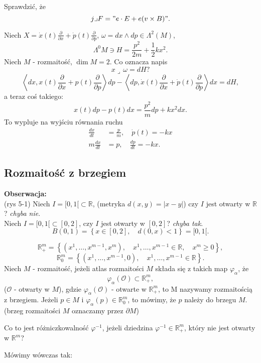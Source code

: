 \documentclass[../main.tex]{subfiles}
\begin{document}
    Sprawdzić, że
    \[
        j \lrcorner F = "e\cdot E + e(v\times B)"
    .\]
\begin{przyklad}
    Niech $X = \dot{x}(t)\frac{\partial }{\partial x} + \dot{p}(t)\frac{\partial }{\partial p} $, $\omega = dx\land dp \in \Lambda^2(M)$,
     \[
         \Lambda^0M \ni H = \frac{p^2}{2m} + \frac{1}{2}kx^2
    .\]
Niech $M$ - rozmaitość, $\dim M = 2$. Co oznacza napis
\[
x\lrcorner\, \omega = dH?
\]
\[
    \left<dx, x(t)\frac{\partial }{\partial x} + p(t)\frac{\partial }{\partial p} \right>dp - \left<dp, \dot{x}(t)\frac{\partial }{\partial x} + \dot{p}(t)\frac{\partial }{\partial p}  \right>dx = dH
,\]
a teraz coś takiego:
\[
    x(t)dp - p(t)dx = \frac{p^2}{m}dp + kx^2dx
.\]
To wypluje na wyjściu równania ruchu
\begin{align*}
    \frac{dx}{dt} &= \frac{p}{m},\quad \dot{p}(t) = -kx\\
    m \frac{dx}{dt} &= p, \quad \frac{dp}{dt} = -kx
.\end{align*}
\end{przyklad}
\subsection{Rozmaitość z brzegiem}
\textbf{Obserwacja:}\\
(rys 5-1)
Niech $I = [0,1[\subset\mathbb{R}$, (metryka $d(x,y) = |x-y|$) czy $I$ jest otwarty w $\mathbb{R}$? \textit{chyba nie}.\\
Niech $I = [0,1[\subset[0,2]$, czy $I$ jest otwarty w $[0,2]$? \textit{chyba tak}.
\[
    B(0,1) = \left\{ x\in [0,2],\quad d(0,x) < 1 \right\} = [0,1[
.\]
\begin{definicja}
    \[
        \mathbb{R}^m_+ = \left\{ (x^1,\ldots,x^{m-1},x^m),\quad x^1,\ldots,x^{m-1}\in\mathbb{R},\quad x^m \ge 0 \right\}
    ,\]
\[
    \mathbb{R}^m_0 = \left\{ (x^1,\ldots,x^{m-1}, 0),\quad x^1,\ldots,x^{m-1}\in\mathbb{R} \right\}
.\]
    Niech $M$ - rozmaitość, jeżeli atlas rozmaitości $M$ składa się z takich map $\varphi_\alpha$, że \[
        \varphi_\alpha(\mathcal{O})\subset\mathbb{R}^m_+
    ,\]
($\mathcal{O}$ - otwarty w $M$), gdzie $\varphi_\alpha(\mathcal{O})$ - otwarte w $\mathbb{R}^m_+$, to M nazywamy rozmaitością z brzegiem. Jeżeli $p\in M$ i $\varphi_\alpha(p)\in \mathbb{R}^m_0$, to mówimy, że $p$ należy do brzegu $M$.\\
    (brzeg rozmaitości $M$ oznaczamy przez $\partial M$)
\end{definicja}
\begin{pytanie}
    Co to jest różniczkowalność $\varphi^{-1}$, jeżeli dziedzina $\varphi^{-1}\in \mathbb{R}^m_+$, który nie jest otwarty w $\mathbb{R}^m$?
\end{pytanie}
Mówimy wówczas tak:
\end{document}
